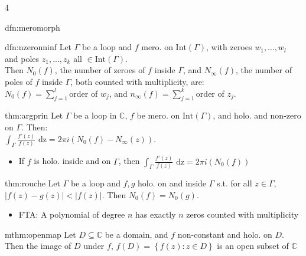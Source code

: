 \documentclass[landscape, 8pt]{extarticle}
\begin{document}
\begin{multicols*}{4}
\begin{dfn}[Meromorphicity]{dfn:meromorph}{ }
		\end{dfn}
		
		\begin{dfn}{dfn:nzeronninf}{ }
			Let $\Gamma$ be a loop and $f$ mero. on $\text{Int}(\Gamma)$, with zeroes $w_1, ..., w_l$ and poles $z_1, ..., z_k$ all $\in \text{Int}(\Gamma)$. \\
			Then $N_0(f)$, the number of zeroes of $f$ inside $\Gamma$, and $N_\infty(f)$, the number of poles of $f$ inside $\Gamma$, both counted with multiplicity, are:\\
			$N_0(f) = \sum_{j=1}^{l}$order of $w_j$, and $n_\infty(f) = \sum_{j=1}^{k}$order of $z_j$.
			
			
		\end{dfn}
		
		
		\begin{thm}{thm:argprin}{ }
			Let $\Gamma$ be a loop in $\mathbb{C}$, $f$ be mero. on $\text{Int}(\Gamma)$, and holo. and non-zero on $\Gamma$. Then:\\
			$\int_{\Gamma}\frac{f'(z)}{f(z)} \text{ dz} = 2 \pi i (N_0(f) - N_\infty(z))$.
			
			\begin{itemize}
				\item If $f$ is holo. inside and on $\Gamma$, then $\int_{\Gamma}\frac{f'(z)}{f(z)} \text{ dz} = 2 \pi i (N_0(f))$
			\end{itemize}
			
			
		\end{thm}
		
		
		\begin{thm}{thm:rouche}{ }
			Let $\Gamma$ be a loop and $f, g$ holo. on and inside $\Gamma$ s.t. for all $z \in \Gamma$, $\left|f(z) - g(z)\right| < \left|f(z)\right|.$ Then $N_0(f) = N_0(g)$.
			\begin{itemize}
				\item FTA: A polynomial of degree $n$ has exactly $n$ zeros counted with multiplicity
			\end{itemize}
			
			
		\end{thm}
		
		
		\begin{mthm}{mthm:openmap}{ }
			Let $D \subseteq \mathbb{C}$ be a domain, and $f$ non-constant and holo. on $D$. Then the image of $D$ under $f$, $f(D) = \left\{f(z) : z\in D\right\}$ is an open subset of $\mathbb{C}$
			

\end{mthm}
\end{multicols*}
\end{document}

